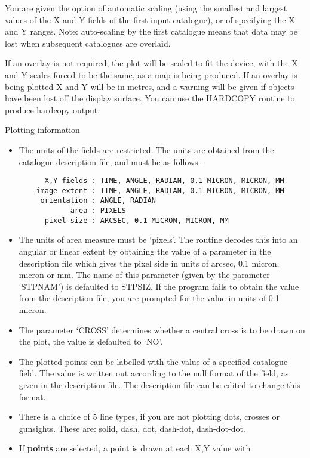 You are given the option of automatic scaling (using the smallest
and largest values of the X and Y fields of the first input
catalogue), or of specifying the X and Y ranges.
Note: auto-scaling by the first catalogue means that data may be lost
when subsequent catalogues are overlaid.

If an overlay is not required, the plot will be scaled to fit the
device, with the X and Y scales forced to be the same, as a map is
being produced.
If an overlay is being plotted X and Y will be in metres, and a warning
will be given if objects have been lost off the display surface.
You can use the HARDCOPY routine to produce hardcopy output.

\begin{description}
\item{Plotting information}
 \begin{itemize}
\item The units of the fields are restricted.
The units are obtained from the catalogue description file, and must
be as follows -
\begin{verbatim}
      X,Y fields : TIME, ANGLE, RADIAN, 0.1 MICRON, MICRON, MM
    image extent : TIME, ANGLE, RADIAN, 0.1 MICRON, MICRON, MM
     orientation : ANGLE, RADIAN
            area : PIXELS
      pixel size : ARCSEC, 0.1 MICRON, MICRON, MM
\end{verbatim}
\item The units of area measure must be `pixels'.
The routine decodes this into an angular or linear extent by obtaining
the value of a parameter in the description file which gives the pixel
side in units of arcsec, 0.1 micron, micron or mm.
The name of this parameter (given by the parameter `STPNAM') is defaulted
to STPSIZ.
If the program fails to obtain the value from the description file, you are
prompted for the value in units of 0.1 micron.
\item The parameter `CROSS' determines whether a central cross is to be
drawn on the plot, the value is defaulted to `NO'.
\item The plotted points can be labelled with the value of a specified
catalogue field.
The value is written out according to the null format of the field, as given
in the description file.
The description file can be edited to change this format.
\item There is a choice of 5 line types, if you are not plotting dots,
crosses or gunsights.
These are: solid, dash, dot, dash-dot, dash-dot-dot.
\item If {\bf points} are selected, a point is drawn at each X,Y value with

\end{itemize}
\end{description}
